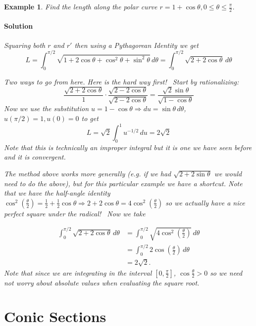 \documentclass[letterpaper, 11pt, openany]{book}
\theoremstyle{mytheoremstyle}
\theoremstyle{myexamplestyle}
\newtheorem{example}{Example}[section]
\newenvironment{solution}{\paragraph{\sffamily \smaller \fontseries{b}\selectfont Solution}}{\hfill\faSquare}
\begin{document}
\begin{example}\label{e:polarlength}
    Find the length along the polar curve $r = 1 + \cos \theta, 0 \leq \theta \leq \frac{\pi}{2}$.
    
    \begin{solution}
        Squaring both $r$ and $r'$ then using a Pythagorean Identity we get
        \[L = \int_{0}^{\pi/2} \sqrt{1 + 2 \cos \theta + \cos^{2} \theta + \sin^{2} \theta}\, d\theta = \int_{0}^{\pi/2} \sqrt{2 + 2\cos \theta} \,d\theta\]
    
    Two ways to go from here. Here is the hard way first! \faSmile \ Start by rationalizing:
    \[\frac{\sqrt{2 + 2\cos \theta}}{1} \cdot \frac{\sqrt{2 - 2\cos \theta}}{\sqrt{2 - 2\cos \theta}} = \frac{\sqrt{2}\sin \theta}{\sqrt{1 - \cos \theta}}\]
    Now we use the substitution $u = 1 - \cos \theta \Rightarrow du = \sin \theta \, d\theta$, $u(\pi/2) = 1, u(0) =  0$ to get
    \[L = \sqrt{2} \int_{0}^{1} u^{-1/2} \, du = 2\sqrt{2}\]
    Note that this is technically an improper integral but it is one we have seen before and it is convergent.

    The method above works more generally (e.g. if we had $\sqrt{2 + 2 \sin \theta}$ we would need to do the above), but for this particular example we have a shortcut. Note that we have the half-angle identity $\cos^{2} \left( \frac{\theta}{2} \right) = \frac{1}{2} + \frac{1}{2} \cos \theta \Rightarrow 2 + 2\cos \theta = 4\cos^{2} \left( \frac{\theta}{2} \right)$ so we actually have a nice perfect square under the radical! \faSmile \ Now we take

    \begin{align*}
        \int_{0}^{\pi/2} \sqrt{2 + 2\cos \theta} \,d\theta  &= \int_{0}^{\pi/2} \sqrt{4\cos^{2} \left( \frac{\theta}{2} \right)}\, d\theta \\
                                                            &= \int_{0}^{\pi/2} 2\cos \left( \frac{\theta}{2} \right)\, d\theta \\
                                                            &= 2\sqrt{2}.
    \end{align*}
    Note that since we are integrating in the interval $\left[ 0, \frac{\pi}{2}\right]$, $\cos \frac{\theta}{2} > 0$ so we need not worry about absolute values when evaluating the square root.
    \end{solution}
\end{example}

\section{Conic Sections}
\setcounter{figure}{0}
\end{document}
